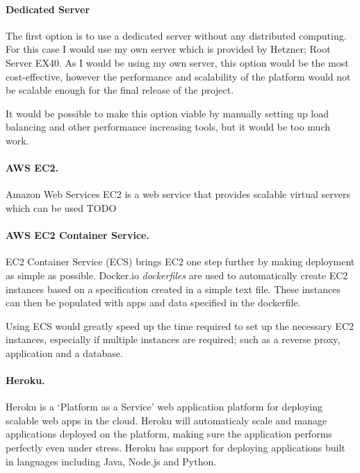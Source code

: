 \documentclass[a4paper, 12pt]{article}
\begin{document}
\paragraph{Dedicated Server}
The first option is to use a dedicated server without any distributed computing. For this case I would use my own server which is provided by Hetzner; Root Server EX40. As I would be using my own server, this option would be the most cost-effective, however the performance and scalability of the platform would not be scalable enough for the final release of the project.


It would be possible to make this option viable by manually setting up load balancing and other performance increasing tools, but it would be too much work.


\paragraph{AWS EC2.}
Amazon Web Services EC2 is a web service that provides scalable virtual servers which can be used TODO


\paragraph{AWS EC2 Container Service.}
EC2 Container Service (ECS) brings EC2 one step further by making deployment as simple as possible. Docker.io \emph{dockerfiles} are used to automatically create EC2 instances based on a specification created in a simple text file. These instances can then be populated with apps and data specified in the dockerfile.


Using ECS would greatly speed up the time required to set up the necessary EC2 instances, especially if multiple instances are required; such as a reverse proxy, application and a database.

\paragraph{Heroku.}
Heroku is a `Platform as a Service' web application platform for deploying scalable web apps in the cloud. Heroku will automaticaly scale and manage applications deployed on the platform, making sure the application performs perfectly even under stress. Heroku has support for deploying applications built in languages including Java, Node.js and Python.
\end{document}

